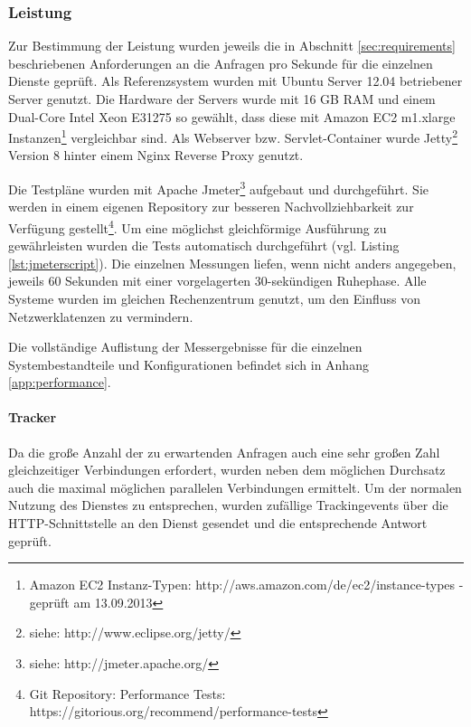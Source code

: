 \subsubsection{Leistung}\label{sec:performance}

Zur Bestimmung der Leistung wurden jeweils die in Abschnitt \ref{sec:requirements} beschriebenen Anforderungen an die Anfragen pro Sekunde für die einzelnen Dienste geprüft. Als Referenzsystem wurden mit Ubuntu Server 12.04 betriebener Server genutzt.  Die Hardware der Servers wurde mit 16 GB RAM und einem Dual-Core Intel Xeon E31275 so gewählt, dass diese mit Amazon EC2 m1.xlarge Instanzen\footnote{Amazon EC2 Instanz-Typen: http://aws.amazon.com/de/ec2/instance-types - geprüft am 13.09.2013} vergleichbar sind. Als Webserver bzw. Servlet-Container wurde Jetty\footnote{siehe: http://www.eclipse.org/jetty/} Version 8 hinter einem Nginx \gls{Reverse Proxy} genutzt.

Die Testpläne wurden mit Apache Jmeter\footnote{siehe: http://jmeter.apache.org/} aufgebaut und durchgeführt. Sie werden in einem eigenen Repository zur besseren Nachvollziehbarkeit zur Verfügung gestellt\footnote{Git Repository: Performance Tests: https://gitorious.org/recommend/performance-tests}. Um eine möglichst gleichförmige Ausführung zu gewährleisten wurden die Tests automatisch durchgeführt (vgl. Listing \ref{lst:jmeterscript}). Die einzelnen Messungen liefen, wenn nicht anders angegeben, jeweils 60 Sekunden mit einer vorgelagerten 30-sekündigen Ruhephase. Alle Systeme wurden im gleichen Rechenzentrum genutzt, um den Einfluss von Netzwerklatenzen zu vermindern.

Die vollständige Auflistung der Messergebnisse für die einzelnen Systembestandteile und Konfigurationen befindet sich in Anhang \ref{app:performance}.

 

\newpage

\paragraph{Tracker} Da die große Anzahl der zu erwartenden Anfragen auch eine sehr großen Zahl gleichzeitiger Verbindungen erfordert, wurden neben dem möglichen Durchsatz auch die maximal möglichen parallelen Verbindungen ermittelt. Um der normalen Nutzung des Dienstes zu entsprechen, wurden zufällige Trackingevents über die HTTP-Schnittstelle an den Dienst gesendet und die entsprechende Antwort geprüft.

